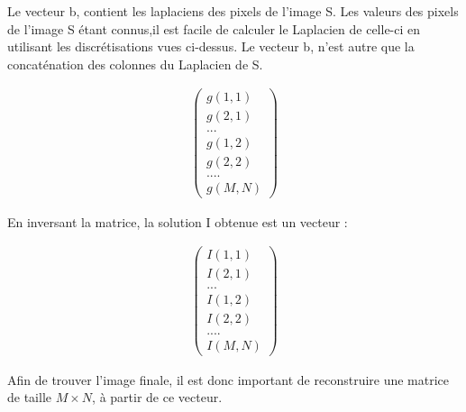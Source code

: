 Le vecteur b, contient les laplaciens des pixels de l'image S.
Les valeurs des pixels de l'image S étant connus,il est facile de calculer le Laplacien de celle-ci en utilisant les discrétisations vues ci-dessus. Le vecteur b, n'est autre que la concaténation des colonnes du Laplacien de S.
\begin{center}
\begin{equation}
\left.
\begin{aligned}
\begin{pmatrix}
g(1,1)\\
g(2,1)\\
...\\
g(1,2)\\
g(2,2)\\
....\\
g(M, N)
\end{pmatrix}
\end{aligned}
\right.
\end{equation}
\end{center}
En inversant la matrice, la solution I obtenue est un vecteur : 
\begin{center}
\begin{equation}
\left.
\begin{aligned}
\begin{pmatrix}
I(1,1)\\
I(2,1)\\
...\\
I(1,2)\\
I(2,2)\\
....\\
I(M, N)
\end{pmatrix}
\end{aligned}
\right.
\end{equation}
\end{center}
Afin de trouver l'image finale, il est donc important de reconstruire une matrice de taille $M\times N$, à partir de ce vecteur. 

